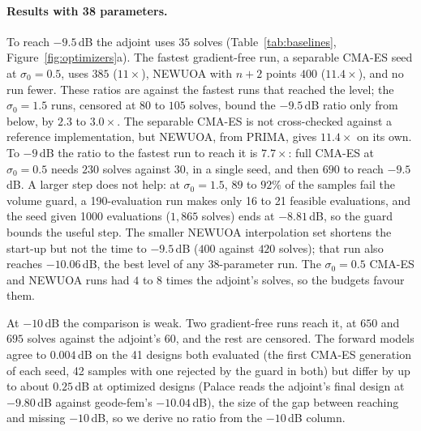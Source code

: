 \documentclass{anvil-paper}
\begin{document}
\paragraph{Results with 38 parameters.}
To reach $-9.5$\,dB the adjoint uses $35$ solves (Table~\ref{tab:baselines},
Figure~\ref{fig:optimizers}a). The fastest gradient-free run, a separable
CMA-ES seed at $\sigma_0 = 0.5$, uses $385$ ($11\times$), NEWUOA with $n + 2$
points $400$ ($11.4\times$), and no run fewer. These ratios are against
the fastest runs that reached the level; the $\sigma_0 = 1.5$ runs, censored
at $80$ to $105$ solves, bound the $-9.5$\,dB ratio only from below, by $2.3$
to $3.0\times$. The separable CMA-ES is not cross-checked against a reference
implementation, but NEWUOA, from PRIMA, gives $11.4\times$ on its own. To $-9$\,dB the ratio to the fastest run to reach it is
$7.7\times$: full CMA-ES at $\sigma_0 = 0.5$ needs $230$ solves against $30$,
in a single seed, and then $690$ to reach $-9.5$\,dB. A larger step does not help:
at $\sigma_0 = 1.5$, $89$ to $92\%$ of the samples fail the volume guard, a
190-evaluation run makes only 16 to 21 feasible evaluations, and the seed
given 1000 evaluations ($1{,}865$ solves) ends at $-8.81$\,dB, so the guard
bounds the useful step. The smaller NEWUOA interpolation set shortens the
start-up but not the time to $-9.5$\,dB ($400$ against $420$ solves); that
run also reaches $-10.06$\,dB, the best level of any 38-parameter run. The
$\sigma_0 = 0.5$ CMA-ES and NEWUOA runs had $4$ to $8$ times the adjoint's
solves, so the budgets favour them.

At $-10$\,dB the comparison is weak. Two gradient-free runs reach it, at
$650$ and $695$ solves against the adjoint's $60$, and the rest are
censored. The forward models agree to $0.004$\,dB on the 41 designs
both evaluated (the first CMA-ES generation of each seed, 42 samples with
one rejected by the guard in both) but differ by up to about $0.25$\,dB at
optimized designs (Palace reads the adjoint's final design at $-9.80$\,dB
against geode-fem's $-10.04$\,dB), the size of the gap between reaching and
missing $-10$\,dB, so we derive no ratio from the $-10$\,dB column.
\end{document}
